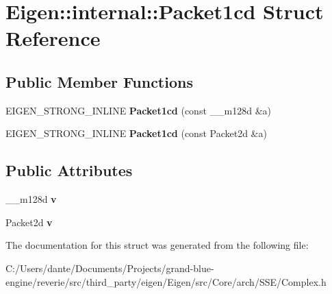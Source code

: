 \hypertarget{struct_eigen_1_1internal_1_1_packet1cd}{}\section{Eigen\+::internal\+::Packet1cd Struct Reference}
\label{struct_eigen_1_1internal_1_1_packet1cd}
\subsection*{Public Member Functions}
\begin{DoxyCompactItemize}
\item 
\mbox{\label{struct_eigen_1_1internal_1_1_packet1cd_aeb444472fc78b80b83f5258b00806fd2}} 
E\+I\+G\+E\+N\+\_\+\+S\+T\+R\+O\+N\+G\+\_\+\+I\+N\+L\+I\+NE {\bfseries Packet1cd} (const \+\_\+\+\_\+m128d \&a)
\item 
\mbox{\label{struct_eigen_1_1internal_1_1_packet1cd_a536e144bdddffb2fbb24024e7bd451b6}} 
E\+I\+G\+E\+N\+\_\+\+S\+T\+R\+O\+N\+G\+\_\+\+I\+N\+L\+I\+NE {\bfseries Packet1cd} (const Packet2d \&a)
\end{DoxyCompactItemize}
\subsection*{Public Attributes}
\begin{DoxyCompactItemize}
\item 
\mbox{\label{struct_eigen_1_1internal_1_1_packet1cd_aee58d36c97f6675b185da155593eb16c}} 
\+\_\+\+\_\+m128d {\bfseries v}
\item 
\mbox{\label{struct_eigen_1_1internal_1_1_packet1cd_acefdb72009987d2a8757b65f1a4f1961}} 
Packet2d {\bfseries v}
\end{DoxyCompactItemize}


The documentation for this struct was generated from the following file\+:\begin{DoxyCompactItemize}
\item 
C\+:/\+Users/dante/\+Documents/\+Projects/grand-\/blue-\/engine/reverie/src/third\+\_\+party/eigen/\+Eigen/src/\+Core/arch/\+S\+S\+E/Complex.\+h\end{DoxyCompactItemize}
